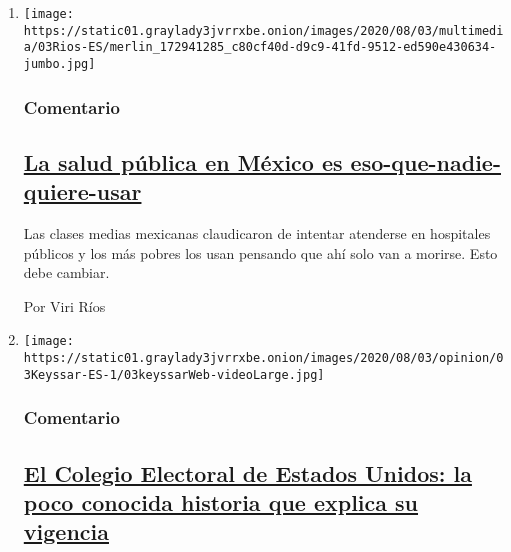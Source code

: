 \begin{enumerate}
\def\labelenumi{\arabic{enumi}.}
\item
  \texttt{[image: https://static01.graylady3jvrrxbe.onion/images/2020/08/03/multimedia/03Rios-ES/merlin\_172941285\_c80cf40d-d9c9-41fd-9512-ed590e430634-jumbo.jpg]}

  \hypertarget{comentario}{%
  \subsubsection{Comentario}\label{comentario}}

  \hypertarget{la-salud-puxfablica-en-muxe9xico-es-eso-que-nadie-quiere-usar}{%
  \subsection{\texorpdfstring{\href{/es/2020/08/03/espanol/opinion/servicio-salud-mexico.html}{La
  salud pública en México es
  eso-que-nadie-quiere-usar}}{La salud pública en México es eso-que-nadie-quiere-usar}}\label{la-salud-puxfablica-en-muxe9xico-es-eso-que-nadie-quiere-usar}}

  Las clases medias mexicanas claudicaron de intentar atenderse en
  hospitales públicos y los más pobres los usan pensando que ahí solo
  van a morirse. Esto debe cambiar.

  Por Viri Ríos
\item
  \texttt{[image: https://static01.graylady3jvrrxbe.onion/images/2020/08/03/opinion/03Keyssar-ES-1/03keyssarWeb-videoLarge.jpg]}

  \hypertarget{comentario-1}{%
  \subsubsection{Comentario}\label{comentario-1}}

  \hypertarget{el-colegio-electoral-de-estados-unidos-la-poco-conocida-historia-que-explica-su-vigencia}{%
  \subsection{\texorpdfstring{\href{/es/2020/08/03/espanol/opinion/colegio-electoral-estados-unidos.html}{El
  Colegio Electoral de Estados Unidos: la poco conocida historia que
  explica su
  vigencia}}{El Colegio Electoral de Estados Unidos: la poco conocida historia que explica su vigencia}}\label{el-colegio-electoral-de-estados-unidos-la-poco-conocida-historia-que-explica-su-vigencia}}


\end{enumerate}
